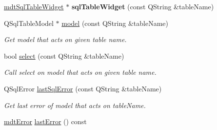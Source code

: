 \begin{DoxyCompactItemize}
\item 
\hypertarget{classmdt_sql_form_a6a17f32077fb7cc33139c3dc26a8d011}{
\hyperlink{classmdt_sql_table_widget}{mdtSqlTableWidget} $\ast$ {\bfseries sqlTableWidget} (const QString \&tableName)}
\label{classmdt_sql_form_a6a17f32077fb7cc33139c3dc26a8d011}

\item 
QSqlTableModel $\ast$ \hyperlink{classmdt_sql_form_ac3f257a2711f66b3cdd811804c0f11b0}{model} (const QString \&tableName)
\begin{DoxyCompactList}\small\item\em Get model that acts on given table name. \end{DoxyCompactList}\item 
bool \hyperlink{classmdt_sql_form_ae9a1f8c03e5ac8ccd01fa804356abd01}{select} (const QString \&tableName)
\begin{DoxyCompactList}\small\item\em Call select on model that acts on given table name. \end{DoxyCompactList}\item 
QSqlError \hyperlink{classmdt_sql_form_ac9d704fa1a47bf59ae04f2945ec7ebc3}{lastSqlError} (const QString \&tableName)
\begin{DoxyCompactList}\small\item\em Get last error of model that acts on tableName. \end{DoxyCompactList}\item 
\hypertarget{classmdt_sql_form_a04724293298421c404e93c58015cda5e}{
\hyperlink{classmdt_error}{mdtError} \hyperlink{classmdt_sql_form_a04724293298421c404e93c58015cda5e}{lastError} () const }
\label{classmdt_sql_form_a04724293298421c404e93c58015cda5e}


\end{DoxyCompactItemize}

